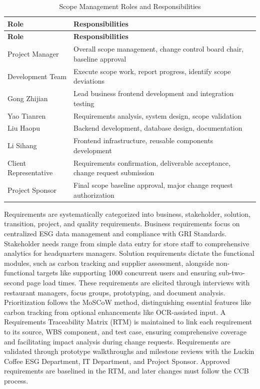 \documentclass[12pt,a4paper]{article}
\begin{document}
\begin{longtable}{@{}l >{\raggedright\arraybackslash}p{11cm}@{}}
\caption{Scope Management Roles and Responsibilities}\label{tab:scope_roles}\\
\toprule
\textbf{Role} & \textbf{Responsibilities} \\ \midrule
\endfirsthead
\toprule
\textbf{Role} & \textbf{Responsibilities} \\ \midrule
\endhead
Project Manager & Overall scope management, change control board chair, baseline approval \\
Development Team & Execute scope work, report progress, identify scope deviations \\
Gong Zhijian & Lead business frontend development and integration testing \\
Yao Tianren & Requirements analysis, system design, scope validation \\
Liu Haopu & Backend development, database design, documentation \\
Li Sihang & Frontend infrastructure, reusable components development \\
Client Representative & Requirements confirmation, deliverable acceptance, change request submission \\
Project Sponsor & Final scope baseline approval, major change request authorization \\ \bottomrule
\end{longtable}
Requirements are systematically categorized into business, stakeholder, solution, transition, project, and quality requirements. Business requirements focus on centralized ESG data management and compliance with GRI Standards. Stakeholder needs range from simple data entry for store staff to comprehensive analytics for headquarters managers. Solution requirements dictate the functional modules, such as carbon tracking and supplier assessment, alongside non-functional targets like supporting 1000 concurrent users and ensuring sub-two-second page load times. These requirements are elicited through interviews with restaurant managers, focus groups, prototyping, and document analysis. Prioritization follows the MoSCoW method, distinguishing essential features like carbon tracking from optional enhancements like OCR-assisted input. A Requirements Traceability Matrix (RTM) is maintained to link each requirement to its source, WBS component, and test case, ensuring comprehensive coverage and facilitating impact analysis during change requests. Requirements are validated through prototype walkthroughs and milestone reviews with the Luckin Coffee ESG Department, IT Department, and Project Sponsor. Approved requirements are baselined in the RTM, and later changes must follow the CCB process.
\end{document}
